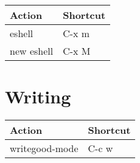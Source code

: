 \documentclass[english]{rcalibritwocolumn}
\begin{document}
\begin{center}
\begin{tabular}{ll}
 \textbf{Action}  &  \textbf{Shortcut}  \\
\hline
 eshell           &  C-x m              \\
 new eshell       &  C-x M              \\
\end{tabular}
\end{center}
\section{Writing}
\label{sec-15}


\begin{center}
\begin{tabular}{ll}
 \textbf{Action}  &  \textbf{Shortcut}  \\
\hline
 writegood-mode   &  C-c w              \\
\end{tabular}
\end{center}
\end{document}
